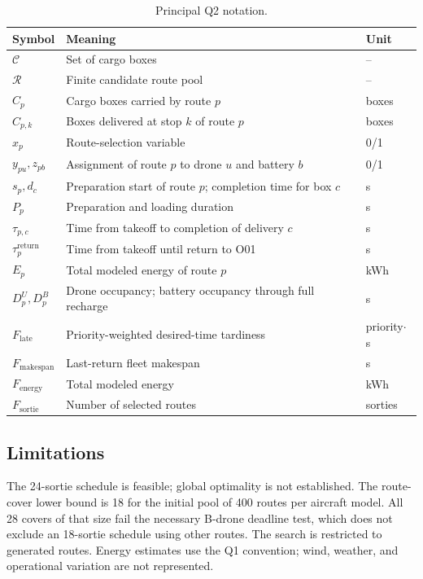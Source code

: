 \documentclass[11pt,a4paper]{article}
\begin{document}
\begin{table}[H]
\centering
\caption{Principal Q2 notation.}
\label{tab:q2-notation}
\small
\begin{tabularx}{\linewidth}{@{}lXl@{}}
\toprule
Symbol & Meaning & Unit\\
\midrule
$\mathcal C$ & Set of cargo boxes & --\\
$\mathcal R$ & Finite candidate route pool & --\\
$C_p$ & Cargo boxes carried by route $p$ & boxes\\
$C_{p,k}$ & Boxes delivered at stop $k$ of route $p$ & boxes\\
$x_p$ & Route-selection variable & 0/1\\
$y_{pu},z_{pb}$ & Assignment of route $p$ to drone $u$ and battery $b$ & 0/1\\
$s_p,d_c$ & Preparation start of route $p$; completion time for box $c$ & s\\
$P_p$ & Preparation and loading duration & s\\
$\tau_{p,c}$ & Time from takeoff to completion of delivery $c$ & s\\
$\tau_p^{\mathrm{return}}$ & Time from takeoff until return to O01 & s\\
$E_p$ & Total modeled energy of route $p$ & kWh\\
$D_p^U,D_p^B$ & Drone occupancy; battery occupancy through full recharge & s\\
$F_{\mathrm{late}}$ & Priority-weighted desired-time tardiness & priority$\cdot$s\\
$F_{\mathrm{makespan}}$ & Last-return fleet makespan & s\\
$F_{\mathrm{energy}}$ & Total modeled energy & kWh\\
$F_{\mathrm{sortie}}$ & Number of selected routes & sorties\\
\bottomrule
\end{tabularx}
\end{table}

\begin{samepage}
\subsection{Limitations}
The 24-sortie schedule is feasible; global optimality is not established. The route-cover lower bound is 18 for the initial pool of 400 routes per aircraft model. All 28 covers of that size fail the necessary B-drone deadline test, which does not exclude an 18-sortie schedule using other routes. The search is restricted to generated routes. Energy estimates use the Q1 convention; wind, weather, and operational variation are not represented.
\end{samepage}
\end{document}
